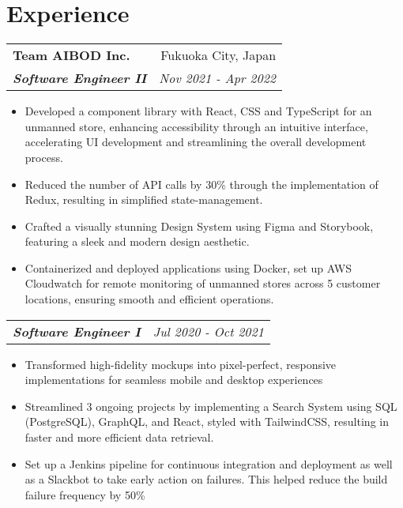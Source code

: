 \documentclass[letterpaper]{article}
\makeatletter
\newcommand{\resumeItemWithoutTitle}[1]{
  \item{
    {#1 \vspace{-2pt}}
  }
}
\newcommand{\resumeSubheadingWithoutTitle}[2]{
  \begin{tabular*}{\textwidth}{l@{\extracolsep{\fill}}r}
        \textbf{\textit{#1}} & \textit{ #2} \\
    \end{tabular*}\vspace{-14pt}
}
\newcommand{\resumeSubheading}[4]{
    \begin{tabular*}{\textwidth}{l@{\extracolsep{\fill}}r}
        \textbf{#1} & #2 \\
        \textbf{\textit{#3}} & \textit{ #4} \\
    \end{tabular*}\vspace{-10pt}
}
\newcommand{\shortSection}[1]{
    \vspace{-6pt}
    \section{#1}
}
\newcommand{\resumeItemListStart}{\begin{itemize}}
\newcommand{\resumeItemListEnd}{\end{itemize}}
\makeatother
\begin{document}
\shortSection{Experience}
\resumeSubheading
{Team AIBOD Inc.}{Fukuoka City, Japan}
{Software Engineer II}{Nov 2021 - Apr 2022}
\vspace{2pt}
\resumeItemListStart
\resumeItemWithoutTitle{Developed a component library with React, CSS and TypeScript for an unmanned store, enhancing accessibility through an intuitive interface, accelerating UI development and streamlining the overall development process.}
\resumeItemWithoutTitle{Reduced the number of API calls by 30\% through the implementation of Redux, resulting in simplified state-management.}
\resumeItemWithoutTitle{Crafted a visually stunning Design System using Figma and Storybook, featuring a sleek and modern design aesthetic.}
\resumeItemWithoutTitle{Containerized and deployed applications using Docker, set up AWS Cloudwatch for remote monitoring of unmanned stores across 5 customer locations, ensuring smooth and efficient operations.}
\resumeItemListEnd

\vspace{2pt}
\resumeSubheadingWithoutTitle
{Software Engineer I}{Jul 2020 - Oct 2021}
\vspace{0pt}
\resumeItemListStart
\resumeItemWithoutTitle{Transformed high-fidelity mockups into pixel-perfect, responsive implementations for seamless mobile and desktop experiences}
\resumeItemWithoutTitle{Streamlined 3 ongoing projects by implementing a Search System using SQL (PostgreSQL), GraphQL, and React, styled with TailwindCSS, resulting in faster and more efficient data retrieval.}
\resumeItemWithoutTitle{Set up a Jenkins pipeline for continuous integration and deployment as well as a Slackbot to take early action on failures. This helped reduce the build failure frequency by 50\%}
\resumeItemListEnd
\end{document}
